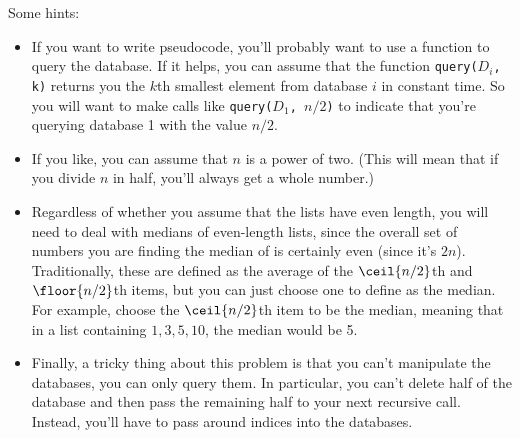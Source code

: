 \documentclass[11pt]{article}
\begin{document}
\begin{enumerate}
Some hints:
\begin{itemize}
    \item If you want to write pseudocode, you'll probably want to use a
    function to query the database. If it helps, you can assume that the
    function \texttt{query($D_i$, k)} returns you the $k$th smallest element
    from database $i$ in constant time. So you will want to make calls like
    \texttt{query($D_1$, $n/2$)} to indicate that you're querying database 1
    with the value $n/2$.
    \item If you like, you can assume that $n$ is a power of two. (This will
    mean that if you divide $n$ in half, you'll always get a whole number.)
    \item Regardless of whether you assume that the lists have even length, you
    will need to deal with medians of even-length lists, since the overall set
    of numbers you are finding the median of is certainly even (since it's
    $2n$). Traditionally, these are defined as the average of the $\ceil{n/2}$th
    and $\floor{n/2}$th items, but you can just choose one to define as the
    median. For example, choose the $\ceil{n/2}$th item to be the median,
    meaning that in a list containing $1, 3, 5, 10$, the median would be 5.
    \item Finally, a tricky thing about this problem is that you can't
    manipulate the databases, you can only query them. In particular, you can't
    delete half of the database and then pass the remaining half to your next
    recursive call. Instead, you'll have to pass around indices into the
    databases.
\end{itemize}

\newpage 


\end{enumerate}
\end{document}

